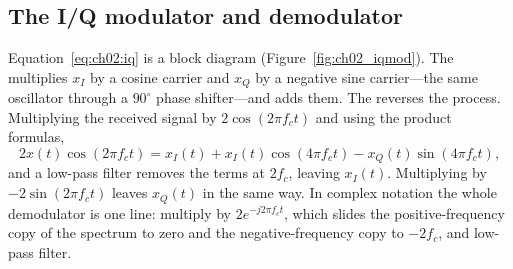 \subsection{The I/Q modulator and demodulator}

Equation~\eqref{eq:ch02:iq} is a block diagram (Figure~\ref{fig:ch02_iqmod}). The
 multiplies $x_I$ by a cosine carrier and $x_Q$ by a negative sine
carrier---the same oscillator through a $90^\circ$ phase shifter---and adds them. The
 reverses the process. Multiplying the received signal by
$2\cos(2\pi f_ct)$ and using the product formulas,
\begin{equation}
2x(t)\cos(2\pi f_ct)=x_I(t)+x_I(t)\cos(4\pi f_ct)-x_Q(t)\sin(4\pi f_ct),
\end{equation}
and a low-pass filter removes the terms at $2f_c$, leaving $x_I(t)$. Multiplying by
$-2\sin(2\pi f_ct)$ leaves $x_Q(t)$ in the same way. In complex notation the whole demodulator is
one line: multiply by $2e^{-j2\pi f_ct}$, which slides the positive-frequency copy of the spectrum to
zero and the negative-frequency copy to $-2f_c$, and low-pass filter.

